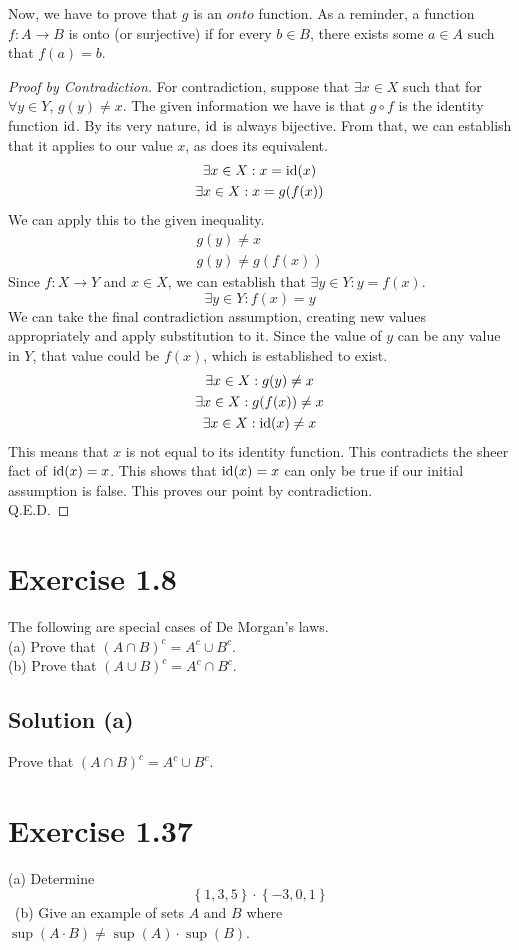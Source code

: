 \documentclass[12pt]{report}
\begin{document}
Now, we have to prove that $g$ is an $onto$ function.
As a reminder, a function $f: A \rightarrow B$ is onto (or surjective) if for every $b \in B$, there exists some $a \in A$ such that $f(a) = b$.
\begin{proof}[Proof by Contradiction]
    For contradiction, suppose that $\exists x \in X$ such that for $\forall y \in Y$, $g(y) \ne x$.
    The given information we have is that $g \circ f$ is the identity function $\text{id}$.
    By its very nature, $\text{id}$ is always bijective. 
    From that, we can establish that it applies to our value $x$, as does its equivalent.
    \begin{gather}
        \exists x \in X: x = \text{id}(x)\\
        \exists x \in X: x = g(f(x))
    \end{gather}
    We can apply this to the given inequality.
    \begin{gather}
        g(y) \ne x\\
        g(y) \ne g(f(x))
    \end{gather}
    Since $f: X \to Y$ and $x \in X$, we can establish that $\exists y \in Y: y = f(x)$.
    \begin{equation}
        \exists y \in Y: f(x) = y
    \end{equation}
    We can take the final contradiction assumption, creating new values appropriately and apply substitution to it.
    Since the value of $y$ can be any value in $Y$, that value could be $f(x)$, which is established to exist.
    \begin{gather}
        \exists x \in X: g(y) \ne x\\
        \exists x \in X: g(f(x)) \ne x\\
        \exists x \in X: \text{id}(x) \ne x
    \end{gather}
    This means that $x$ is not equal to its identity function.
    This contradicts the sheer fact of $\text{id}(x) = x$.
    This shows that $\text{id}(x) = x$ can only be true if our initial assumption is false.
    This proves our point by contradiction.\\
    Q.E.D.
\end{proof}


\pagebreak
\section{Exercise 1.8}
The following are special cases of De Morgan's laws.\\
(a) Prove that $(A \cap B)^c = A^c \cup B^c$. \\
(b) Prove that $(A \cup B)^c = A^c \cap B^c$. 

\subsection{Solution (a)}
Prove that $(A \cap B)^c = A^c \cup B^c$.


\pagebreak
\section{Exercise 1.37}
(a) Determine
\[ \left\{1,3,5\right\} \cdot \left\{-3,0,1\right\} \]
\
(b) Give an example of sets $A$ and $B$ where $\sup(A\cdot B) \ne \sup(A) \cdot \sup(B)$.
\end{document}
